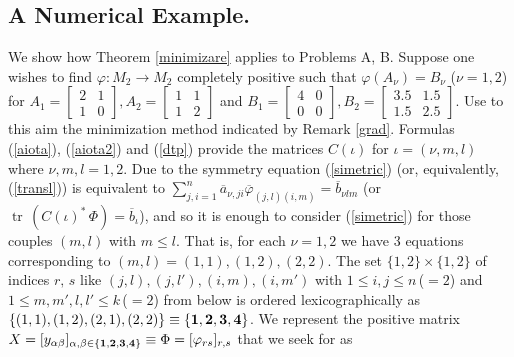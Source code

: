 \documentclass[12pt]{amsart}
\theoremstyle{definition}
\begin{document}
\subsection{A Numerical Example.}\label{ss:ne}
We show  how
Theorem \ref{minimizare}  applies to Problems A, B. 
Suppose one wishes to find   $\varphi :M_2 \to M_2$ completely positive
such that $\varphi (A_\nu) =B_\nu$ ($\nu =1,2$) for
$
 A_1 =\left[ \begin{array}{cc}2 & 1 \\ 1& 0\end{array}\right] , A_2 =\left[ \begin{array}{cc}1 & 1\\ 1& 2\end{array}\right] $ and  $
B_1 =\left[ \begin{array}{cc}4 & 0 \\ 0 & 0\end{array}\right] , B_2 =\left[ \begin{array}{cc}3.5 & 1.5 \\ 1.5 & 2.5 \end{array}\right] 
$.
 Use to this aim the minimization method indicated by Remark \ref{grad}.   
Formulas (\ref{aiota}), (\ref{aiota2}) and (\ref{dtp}) provide the matrices $C({\iota})$ 
for $\iota =(\nu ,m,l)$ where $\nu ,m,l=1,2$.
Due to the symmetry  equation (\ref{simetric}) (or, equivalently, (\ref{transl})) is 
equivalent to $\sum_{j,i=1}^n \overline{a}_{\nu ,ji}\overline{\varphi}_{(j,l)(i,m)}=
\overline{b}_{\nu lm}$ (or ${\operatorname{tr}}\, (C(\iota )^* \, \Phi )=\overline{b}_\iota$), and so it is 
enough to consider (\ref{simetric}) for those couples $(m,l)$ with $m\leq l$. That is, 
for each $\nu =1,2$ we have 3 equations corresponding to $(m,l)=(1,1),(1,2),(2,2)$.
 The set
 $\{ 1,2\} \times \{ 1,2\}$ of indices $r,\, s$ like $(j,l), (j,l'),(i,m), (i,m') $  with $1\leq i,j
 \leq n\, $($=2$) and $1\leq m,m',l,l'\leq k\, $($=2$) from below is   ordered 
 lexicographically as $\{ (1,1),(1,2),(2,1),(2,2)\} \equiv \{ {\bf 1},{\bf 2},{\bf 3},{\bf 4}\} $. 
We represent the positive matrix $X=[y_{\alpha \beta }]_{\alpha , \beta \in \{ {\bf 1},{\bf 
2},{\bf 3},{\bf 4}\}}\equiv \Phi =[\varphi_{rs}]_{r,s}$ that we seek for as
\end{document}
